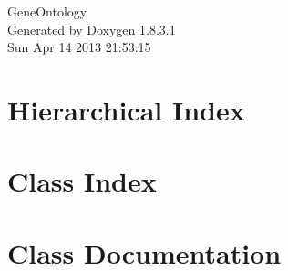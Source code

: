 \documentclass{book}
\begin{document}
\hypersetup{pageanchor=false,citecolor=blue}
\begin{titlepage}
\vspace*{7cm}
\begin{center}
{\Large Gene\-Ontology }\\
\vspace*{1cm}
{\large Generated by Doxygen 1.8.3.1}\\
\vspace*{0.5cm}
{\small Sun Apr 14 2013 21:53:15}\\
\end{center}
\end{titlepage}
\clearemptydoublepage
{}
\tableofcontents
\clearemptydoublepage
{}
\hypersetup{pageanchor=true,citecolor=blue}
\chapter{Hierarchical Index}

\chapter{Class Index}

\chapter{Class Documentation}















\printindex
\end{document}
